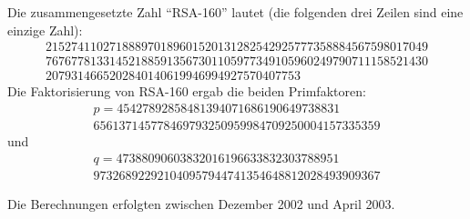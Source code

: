 \begin{refsegment}
Die zusammengesetzte Zahl "`RSA-160"' lautet (die folgenden drei Zeilen
sind eine einzige Zahl):
$$
\begin{array}{c}
215274110271888970189601520131282542925777358884567598017049\\
767677813314521885913567301105977349105960249790711158521430\\
2079314665202840140619946994927570407753
\end{array}
$$
Die Faktorisierung von RSA-160 ergab die beiden Primfaktoren:
$$
\begin{array}{c}
p = 45427892858481394071686190649738831\\
    656137145778469793250959984709250004157335359
\end{array}
$$
und
$$
\begin{array}{c}
q = 47388090603832016196633832303788951\\
    973268922921040957944741354648812028493909367
\end{array}
$$

Die Berechnungen erfolgten zwischen Dezember 2002 und April 2003.



%
%





\end{refsegment}
